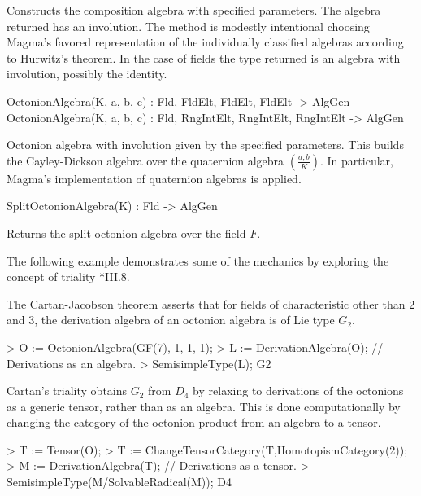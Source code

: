 Constructs the composition algebra with specified parameters.  The algebra returned
has an involution.  
The method is modestly intentional choosing Magma's favored representation of
the individually classified algebras according to Hurwitz's theorem.  In the case of
fields the type returned is an algebra with involution, possibly the identity.


\begin{intrinsics}
OctonionAlgebra(K, a, b, c) : Fld, FldElt, FldElt, FldElt -> AlgGen
OctonionAlgebra(K, a, b, c) : Fld, RngIntElt, RngIntElt, RngIntElt -> AlgGen
\end{intrinsics}

Octonion algebra with involution given by the specified parameters.
This builds the Cayley-Dickson algebra over the quaternion algebra
$\left(\frac{a,b}{K}\right)$.  In particular, Magma's implementation
of quaternion algebras is applied.

\begin{intrinsics}
SplitOctonionAlgebra(K) : Fld -> AlgGen
\end{intrinsics}

Returns the split octonion algebra over the field $F$.


\begin{example}[TenTriality]
The following example demonstrates some of the mechanics by exploring
the concept of triality \cite{Schafer}*{III.8}.

The Cartan-Jacobson theorem asserts that for fields of characteristic other
than 2 and 3, the derivation algebra of an octonion algebra is of Lie type 
$G_2$.

\begin{code}
> O := OctonionAlgebra(GF(7),-1,-1,-1);
> L := DerivationAlgebra(O);   // Derivations as an algebra.
> SemisimpleType(L);
G2
\end{code}

Cartan's triality obtains $G_2$ from $D_4$ by relaxing to
derivations of the octonions as a generic tensor, rather than as an 
algebra.  
This is done computationally by changing the category of the octonion product
from an algebra to a tensor.

\begin{code}
> T := Tensor(O);
> T := ChangeTensorCategory(T,HomotopismCategory(2)); 
> M := DerivationAlgebra(T);  // Derivations as a tensor.
> SemisimpleType(M/SolvableRadical(M));
D4
\end{code}
\end{example}


